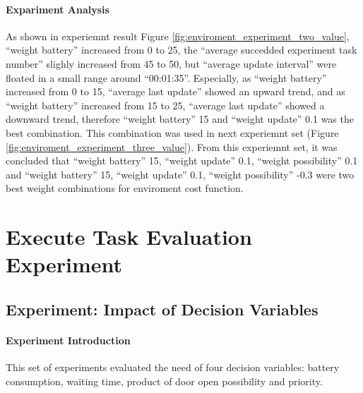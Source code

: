 \paragraph{Expariment Analysis} 
As shown in experiemnt result Figure \ref{fig:enviroment_experiment_two_value}, ``weight battery'' increased from 0 to 25, the ``average succedded experiment task number'' slighly increased from 45 to 50, but ``average update interval'' were floated in a small range around ``00:01:35''. Especially, as ``weight battery'' increased from 0 to 15, ``average last update'' showed an upward trend, and as ``weight battery'' increased from 15 to 25, ``average last update'' showed a downward trend, 
therefore ``weight battery'' 15 and ``weight update'' 0.1 was the best combination. 
This combination was used in next experiemnt set (Figure \ref{fig:enviroment_experiment_three_value}). From this experiemnt set, it was concluded that ``weight battery'' 15, ``weight update'' 0.1, ``weight possibility'' 0.1 and ``weight battery'' 15, ``weight update'' 0.1, ``weight possibility'' -0.3 were two best weight combinations for enviroment cost function.

\section{Execute Task Evaluation Experiment}

\subsection{Experiment: Impact of Decision Variables}

\paragraph{Experiment Introduction} 
This set of experiments evaluated the need of four decision variables: battery consumption, waiting time, product of door open possibility and priority. 

